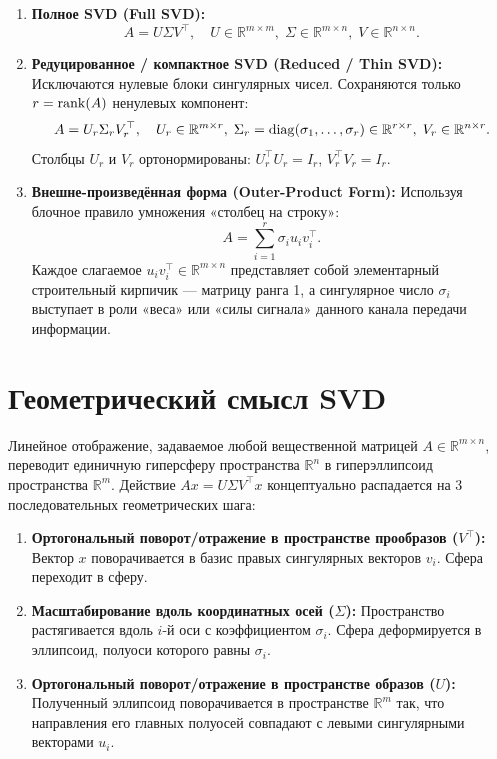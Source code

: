     \begin{enumerate}
        \item \textbf{Полное SVD (Full SVD):}
        \[ A = U \Sigma V^\top, \quad U \in \mathbb{R}^{m \times m}, \; \Sigma \in \mathbb{R}^{m \times n}, \; V \in
        \mathbb{R}^{n \times n}. \]
        \item \textbf{Редуцированное / компактное SVD (Reduced / Thin SVD):}
        Исключаются нулевые блоки сингулярных чисел.
        Сохраняются только $r = \operatorname{rank}(A)$ ненулевых компонент:
        \[ A = U_r \Sigma_r V_r^\top, \quad U_r \in \mathbb{R}^{m \times r}, \; \Sigma_r =
        \operatorname{diag}(\sigma_1, \dots, \sigma_r) \in \mathbb{R}^{r \times r}, \; V_r \in \mathbb{R}^{n \times r}. \]
        Столбцы $U_r$ и $V_r$ ортонормированы: $U_r^\top U_r = I_r$, $V_r^\top V_r = I_r$.
        \item \textbf{Внешне-произведённая форма (Outer-Product Form):}
        Используя блочное правило умножения «столбец на строку»:
        \[ A = \sum_{i=1}^r \sigma_i u_i v_i^\top. \]
        Каждое слагаемое $u_i v_i^\top \in \mathbb{R}^{m \times n}$ представляет собой элементарный строительный
        кирпичик — матрицу ранга 1, а сингулярное число $\sigma_i$ выступает в роли «веса» или «силы сигнала»
        данного канала передачи информации.
    \end{enumerate}

    \section{Геометрический смысл SVD}

    Линейное отображение, задаваемое любой вещественной матрицей $A \in \mathbb{R}^{m \times n}$, переводит единичную
    гиперсферу пространства $\mathbb{R}^n$ в гиперэллипсоид пространства $\mathbb{R}^m$.
    Действие $A x = U \Sigma V^\top x$ концептуально распадается на 3 последовательных геометрических шага:
    \begin{enumerate}
        \item \textbf{Ортогональный поворот/отражение в пространстве прообразов ($V^\top$):} Вектор $x$
        поворачивается в базис правых сингулярных векторов $v_i$.
        Сфера переходит в сферу.
        \item \textbf{Масштабирование вдоль координатных осей ($\Sigma$):} Пространство растягивается вдоль $i$-й оси с
        коэффициентом $\sigma_i$.
        Сфера деформируется в эллипсоид, полуоси которого равны $\sigma_i$.
        \item \textbf{Ортогональный поворот/отражение в пространстве образов ($U$):} Полученный эллипсоид поворачивается
        в пространстве $\mathbb{R}^m$ так, что направления его главных полуосей совпадают с левыми сингулярными
        векторами $u_i$.
    \end{enumerate}


